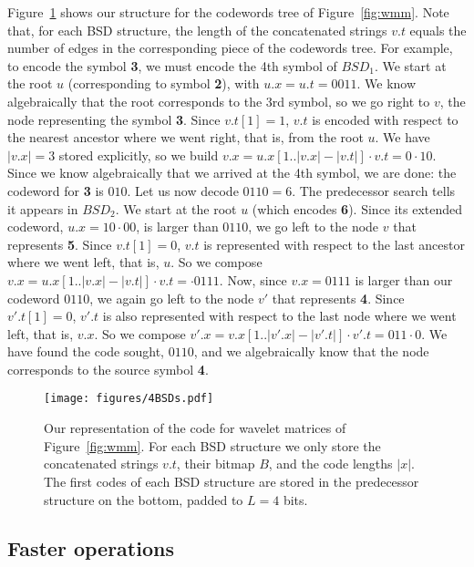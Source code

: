 \documentclass[preprint,12pt]{elsarticle}
\begin{document}
Figure~\ref{fig:bsd} shows our structure for the codewords tree of
Figure~\ref{fig:wmm}. Note that, for each BSD structure, the length of the
concatenated strings $v.t$ equals the number of edges in the corresponding
piece of the codewords tree. For example, to encode the symbol {\bf 3}, we
must encode the 4th symbol of $BSD_1$. We start at the root $u$ (corresponding
to symbol {\bf 2}), with $u.x=u.t=0011$. We know algebraically that the root
corresponds to the 3rd symbol, so we go right to $v$, the node representing
the symbol {\bf 3}. Since $v.t[1]=1$, $v.t$ is encoded with respect to the
nearest ancestor where we went right, that is, from the root $u$. We have
$|v.x|=3$ stored explicitly, so we build $v.x = u.x[1..|v.x|-|v.t|] \cdot v.t
= 0\cdot 10$. Since we know algebraically that we arrived at the 4th symbol, 
we are done: the codeword for {\bf 3} is $010$. Let us now decode $0110=6$.
The predecessor search tells it appears in $BSD_2$. We start at the root $u$
(which encodes {\bf 6}). Since its extended codeword, $u.x = 10\cdot 00$, is
larger than $0110$, we go left to the node $v$ that represents {\bf 5}. Since
$v.t[1]=0$, $v.t$ is represented with respect to the last ancestor where we
went left, that is, $u$. So we compose $v.x = u.x[1..|v.x|-|v.t|] \cdot v.t =
\cdot 0111$. Now, since $v.x = 0111$ is larger than our codeword $0110$, we 
again
go left to the node $v'$ that represents {\bf 4}. Since $v'.t[1]=0$, $v'.t$
is also represented with respect to the last node where we went left, that is,
$v.x$. So we compose $v'.x = v.x[1..|v'.x|-|v'.t|] \cdot v'.t = 011 \cdot 0$.
We have found the code sought, $0110$, and we algebraically know that the node
corresponds to the source symbol {\bf 4}.

\begin{figure}[t]
\begin{center}
\texttt{[image: figures/4BSDs.pdf]}
\end{center}
\vspace*{-5mm}
\caption{Our representation of the code for wavelet matrices of 
Figure~\ref{fig:wmm}. For each BSD structure we only store the
concatenated strings $v.t$, their bitmap $B$, and the code lengths $|x|$.
The first codes of each BSD structure are stored in the predecessor structure
on the bottom, padded to $L=4$ bits.}
\label{fig:bsd}
\end{figure}

\subsection{Faster operations}
\end{document}
